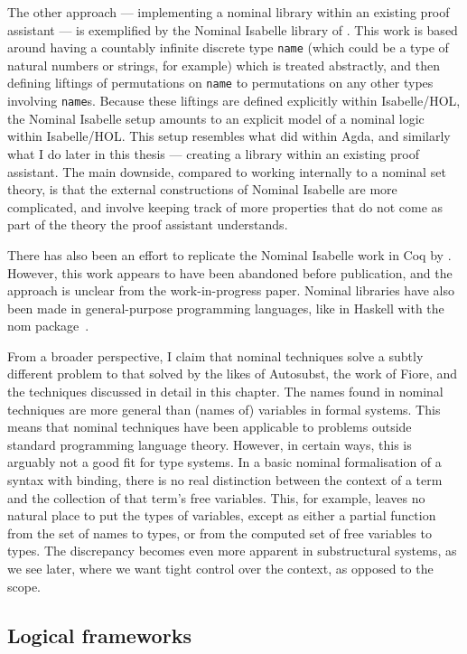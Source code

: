 The other approach --- implementing a nominal library within an existing proof
assistant --- is exemplified by the Nominal Isabelle library of \citet{Urban08}.
This work is based around having a countably infinite discrete type
\texttt{name} (which could be a type of natural numbers or strings, for example)
which is treated abstractly, and then defining liftings of permutations on
\texttt{name} to permutations on any other types involving \texttt{name}s.
Because these liftings are defined explicitly within Isabelle/HOL, the Nominal
Isabelle setup amounts to an explicit model of a nominal logic within
Isabelle/HOL.
This setup resembles what \citet{AACMM21} did within Agda, and similarly what I
do later in this thesis --- creating a library within an existing proof
assistant.
The main downside, compared to working internally to a nominal set theory, is
that the external constructions of Nominal Isabelle are more complicated, and
involve keeping track of more properties that do not come as part of the theory
the proof assistant understands.

There has also been an effort to replicate the Nominal Isabelle work in Coq by
\citet{ABW06}.
However, this work appears to have been abandoned before publication, and the
approach is unclear from the work-in-progress paper.
Nominal libraries have also been made in general-purpose programming languages,
like in Haskell with the nom package~\citep{Gabbay20}.

From a broader perspective, I claim that nominal techniques solve a subtly
different problem to that solved by the likes of Autosubst, the work of Fiore,
and the techniques discussed in detail in this chapter.
The names found in nominal techniques are more general than (names of)
variables in formal systems.
This means that nominal techniques have been applicable to problems outside
standard programming language theory.
However, in certain ways, this is arguably not a good fit for type systems.
In a basic nominal formalisation of a syntax with binding, there is no real
distinction between the context of a term and the collection of that term's free
variables.
This, for example, leaves no natural place to put the types of variables, except
as either a partial function from the set of names to types, or from the
computed set of free variables to types.
The discrepancy becomes even more apparent in substructural systems, as we see
later, where we want tight control over the context, as opposed to the scope.

\subsection{Logical frameworks}\label{sec:lf}

